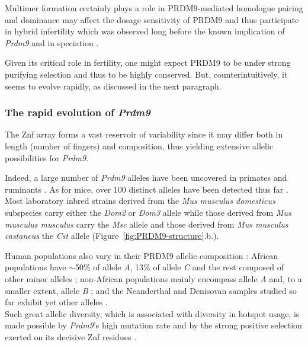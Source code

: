 Multimer formation certainly plays a role in PRDM9-mediated homologue pairing \citep{davies2016reengineering} and dominance may affect the dosage sensitivity of PRDM9 \citep{flachs2012interallelic, segurel2011case} and thus participate in hybrid infertility which was observed long before the known implication of \textit{Prdm9} \citep{forejt1974genetic} and in speciation \citep{mihola2009mouse}.

Given its critical role in fertility, one might expect PRDM9 to be under strong purifying selection and thus to be highly conserved. 
But, counterintuitively, it seems to evolve rapidly, as discussed in the next paragraph.


\subsubsection{The rapid evolution of \textit{Prdm9}}

The Znf array forms a vast reservoir of variability since it may differ both in length (number of fingers) and composition, thus yielding extensive allelic possibilities for \textit{Prdm9}.

Indeed, a large number of \textit{Prdm9} alleles have been uncovered in primates \citep{groeneveld2012high,heerschop2016pioneering} and ruminants \citep{ahlawat2016zinc}.
As for mice, over 100 distinct alleles have been detected thus far \citep{buard2014diversity, kono2014prdm9}.
Most laboratory inbred strains derived from the \textit{Mus musculus domesticus} subspecies carry either the \textit{Dom2} or \textit{Dom3} allele while those derived from \textit{Mus musculus musculus} carry the \textit{Msc} allele and those derived from \textit{Mus musculus castaneus} the \textit{Cst} allele (Figure~\ref{fig:PRDM9-structure}.b.).

Human populations also vary in their PRDM9 allelic composition \citep{berg2010prdm9, berg2011variants, fledel-alon2011variation}: African populations have $\sim$50\% of allele \textit{A}, 13\% of allele \textit{C} and the rest composed of other minor alleles \citep{berg2011variants}; non-African populations mainly encompass allele \textit{A} and, to a smaller extent, allele \textit{B} \citep{baudat2010prdm9,berg2010prdm9,hinch2011landscape}; and the Neanderthal and Denisovan samples studied so far exhibit yet other alleles \citep{schwartz2014primate,lesecque2014red}.\\

Such great allelic diversity, which is associated with diversity in hotspot usage, is made possible by \textit{Prdm9}'s high mutation rate \citep{jeffreys2013recombination} and by the strong positive selection exerted on its decisive Znf residues \citep{oliver2009accelerated,thomas2009extraordinary,ponting2011what}.





